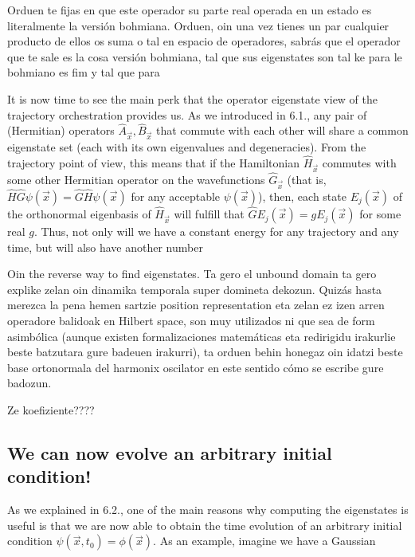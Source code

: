 \documentclass[11pt, a4paper]{article} %
\begin{document}
Orduen te fijas en que este operador su parte real operada en un estado es literalmente la versión bohmiana. Orduen, oin una vez tienes un par cualquier producto de ellos os suma o tal en espacio de operadores, sabrás que el operador que te sale es la cosa versión bohmiana, tal que sus eigenstates son tal ke para le bohmiano es fim y tal que para 

It is now time to see the main perk that the operator eigenstate view of the trajectory orchestration provides us. As we introduced in 6.1., any pair of (Hermitian) operators $\hat{A}_{\vec{x}},\hat{B}_{\vec{x}}$ that commute with each other will share a common eigenstate set (each with its own eigenvalues and degeneracies). From the trajectory point of view, this means that if the Hamiltonian $\hat{H}_{\vec{x}}$ commutes with some other Hermitian operator on the wavefunctions $\hat{G}_{\vec{x}}$ (that is, $\hat{H}\hat{G}\psi(\vec{x})=\hat{G}\hat{H}\psi(\vec{x})$ for any acceptable $\psi(\vec{x})$), then, each state $E_j(\vec{x})$ of the orthonormal eigenbasis of $\hat{H}_{\vec{x}}$ will fulfill that $\hat{G}E_j(\vec{x})=gE_j(\vec{x})$ for some real $g$. Thus, not only will we have a constant energy for any trajectory and any time, but will also have another number






Oin the reverse way to find eigenstates. Ta gero el unbound domain ta gero explike zelan oin dinamika temporala super domineta dekozun. Quizás hasta merezca la pena hemen sartzie position representation eta zelan ez izen arren operadore balidoak en Hilbert space, son muy utilizados ni que sea de form asimbólica (aunque existen formalizaciones matemáticas eta redirigidu irakurlie beste batzutara gure badeuen irakurri), ta orduen behin honegaz oin idatzi beste base ortonormala del harmonix oscilator en este sentido cómo se escribe gure badozun.

Ze koefiziente????




 
\subsection*{We can now evolve an arbitrary initial condition!}

As we explained in 6.2., one of the main reasons why computing the eigenstates is useful is that we are now able to obtain the time evolution of an arbitrary initial condition $\psi(\vec{x},t_0)=\phi(\vec{x})$. As an example, imagine we have a Gaussian 
\end{document}
